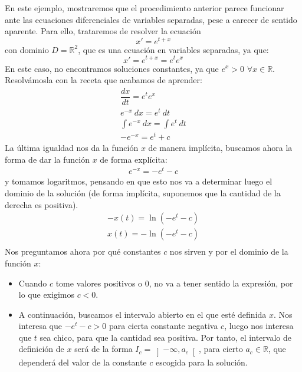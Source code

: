\begin{ejemplo}
    En este ejemplo, mostraremos que el procedimiento anterior parece funcionar ante las ecuaciones diferenciales de variables separadas, pese a carecer de sentido aparente. Para ello, trataremos de resolver la ecuación
    \begin{equation*}
        x' = e^{t+x}
    \end{equation*}
    con dominio $D=\mathbb{R}^2$, que es una ecuación en variables separadas, ya que:
    \begin{equation*}
        x' = e^{t+x} = e^t e^x
    \end{equation*}
    En este caso, no encontramos soluciones constantes, ya que $e^x>0$ $\forall x\in \mathbb{R}$. Resolvámosla con la receta que acabamos de aprender:
    \begin{gather*}
        \dfrac{dx}{dt} = e^t e^x \\
        e^{-x}~dx = e^t~dt \\
        \int e^{-x}~dx = \int e^t~dt \\
        -e^{-x} = e^t + c
    \end{gather*}
    La última igualdad nos da la función $x$ de manera implícita, buscamos ahora la forma de dar la función $x$ de forma explícita:
    \begin{gather*}
        e^{-x} = -e^t - c
    \end{gather*}
    y tomamos logaritmos, pensando en que esto nos va a determinar luego el dominio de la solución (de forma implícita, suponemos que la cantidad de la derecha es positiva).
    \begin{gather*}
        -x(t) = \ln (-e^{t}-c) \\
        x(t) = -\ln (-e^{t}-c) \\
    \end{gather*}
    Nos preguntamos ahora por qué constantes $c$ nos sirven y por el dominio de la función $x$:
    \begin{itemize}
        \item Cuando $c$ tome valores positivos o $0$, no va a tener sentido la expresión, por lo que exigimos $c<0$.
        \item A continuación, buscamos el intervalo abierto en el que esté definida $x$. Nos interesa que $-e^t -c > 0$ para cierta constante negativa $c$, luego nos interesa que $t$ sea chico, para que la cantidad sea positiva. Por tanto, el intervalo de definición de $x$ será de la forma $I_c = \left]-\infty, a_c\right[$, para cierto $a_c\in \mathbb{R}$, que dependerá del valor de la constante $c$ escogida para la solución.

\end{itemize}
\end{ejemplo}
